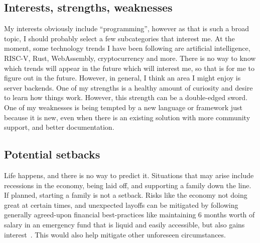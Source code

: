 \subsection{Interests, strengths, weaknesses}
My interests obviously include ``programming'', however as that is such a broad
topic, I should probably select a few subcategories that interest me.  At the
moment, some technology trends I have been following are artificial
intelligence, RISC-V, Rust, WebAssembly, cryptocurrency and more.  There is no
way to know which trends will appear in the future which will interest me, so
that is for me to figure out in the future. However, in general, I think an area
I might enjoy is server backends.  One of my strengths is a healthy amount of
curiosity and desire to learn how things work. However, this strength can be a
double-edged sword. One of my weaknesses is being tempted by a new language or
framework just because it is new, even when there is an existing solution with
more community support, and better documentation. 

\subsection{Potential setbacks}
Life happens, and there is no way to predict it. Situations that may arise
include recessions in the economy, being laid off, and supporting a family down
the line. If planned, starting a family is not a setback.  Risks like the
economy not doing great at certain times, and unexpected layoffs can be
mitigated by following generally agreed-upon financial best-practices like
maintaining 6 months worth of salary in an emergency fund that is liquid and
easily accessible, but also gains interest~\cite{r/personalfinancecanada}. This
would also help mitigate other unforeseen circumstances. 
